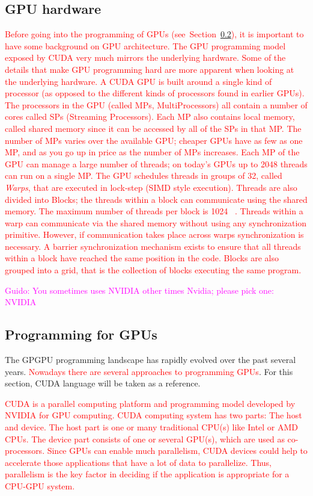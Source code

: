 \documentclass[Ingles]{ic-tese-v1}
\newcommand{\guido}[1]{\noindent\textcolor{magenta}{Guido: {#1}}}
\newcommand{\ed}[1]{\noindent\textcolor{red}{ {#1}}}
\newcommand{\guido}[1]{}
\newcommand{\ed}[1]{}
\newcommand{\rsec}[1]{Section~\ref{sec:#1}}
\newcommand{\tit}[1]{{\textit{#1}}}
\begin{document}
\subsection{GPU hardware}
\label{sec:gpugardware}
\ed{Before going into the programming of GPUs (see~\rsec{gpuprogramming}), it is
important to have some background on GPU architecture.  The GPU programming
model exposed by CUDA very much mirrors the underlying hardware. Some of the
details that make GPU programming hard are more apparent when looking at the
underlying hardware.  A CUDA GPU is built around a single kind of processor (as
opposed to the different kinds of processors found in earlier GPUs). The
processors in the GPU (called MPs, MultiProcessors) all contain a number of
cores called SPs (Streaming Processors).  Each MP also contains local memory,
called shared memory since it can be accessed by all of the SPs in that MP. The
number of MPs varies over the available GPU; cheaper GPUs have as few as one
MP, and as you go up in price as the number of MPs increases.  Each MP of the GPU
can manage a large number of threads; on today’s GPUs up to 2048 threads can
run on a single MP. The GPU schedules threads in groups of 32, called \tit{Warps},
that are executed in lock-step (SIMD style execution). Threads are also divided
into Blocks; the threads within a block can communicate using the shared
memory. The maximum number of threads per block is 1024
~\cite{NvidiaGuide2018}. Threads within a warp can communicate via the shared
memory without using any synchronization primitive. However, if communication
takes place across warps synchronization is necessary. A barrier
synchronization mechanism exists to ensure that all threads within a block have
reached the same position in the code. Blocks are also grouped into a grid,
that is the collection of blocks executing the same program.}

\guido{You sometimes uses NVIDIA other times Nvidia; please pick one: NVIDIA}
\subsection{Programming for GPUs}
\label{sec:gpuprogramming}
The GPGPU programming landscape has rapidly evolved over the past several
years. \ed{Nowadays there are several approaches to
programming GPUs}. For this section, CUDA language will be taken as a reference.

\ed{CUDA is a parallel computing platform and programming model developed by NVIDIA
 for GPU computing.  CUDA computing system has two parts: The host and
device.  The host part is one or many traditional CPU(s) like Intel or AMD
CPUs. The device part consists of one or several GPU(s), which are used as
co-processors. Since GPUs can enable much  parallelism, CUDA devices could
help to accelerate those applications that have a lot of data to  parallelize.
Thus, parallelism is the key factor in deciding if the application is appropriate
for a CPU-GPU system.}
\end{document}

